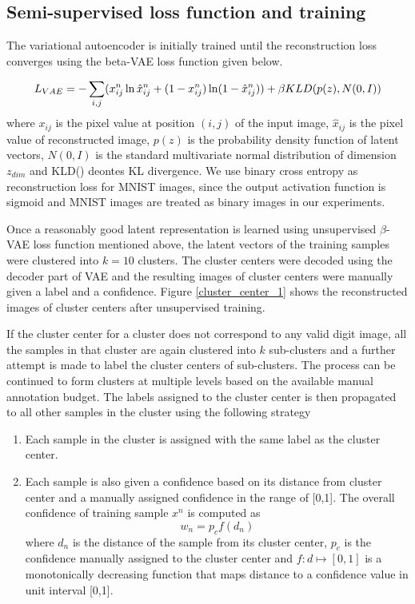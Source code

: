 \documentclass[runningheads]{llncs}
\begin{document}
\subsection{Semi-supervised loss function and training}\label{section_loss_function}
The variational autoencoder is initially trained until the reconstruction loss converges using the beta-VAE loss function\cite{beta_vae} given below.

\begin{equation} \label{vae_loss_eqn}
L_{VAE} = -\sum_{i, j}(x_{ij}^n \ln \hat{x}_{ij}^n
+ (1 - x_{ij}^n) \ln(1 -  \hat{x}_{ij}^n ) )\\
    +\beta KLD(p(z), N(0,I))
\end{equation}
where   $x_{ij}$ is the pixel value at position $(i, j)$ of the input image, $\hat{x}_{ij}$ is the pixel value of reconstructed image, $p(z)$ is the probability density function of latent vectors, $N(0,I)$ is the standard multivariate normal distribution of dimension $z_{dim}$ and KLD() deontes KL divergence.
We use binary cross entropy as reconstruction loss for MNIST images, since the output activation function is sigmoid and MNIST images are treated as binary images in our experiments.

Once a reasonably good latent representation is learned using unsupervised $\beta$-VAE loss function mentioned above, the latent vectors of the training samples were clustered into $k=10$ clusters.
The cluster centers were decoded using the decoder part of VAE and the resulting images of cluster centers were manually given a label and a confidence.
Figure \ref{cluster_center_1} shows the reconstructed images of cluster centers after unsupervised training.


If the cluster center for a cluster does not correspond to any valid digit image, all the samples in that cluster are again clustered into $k$ sub-clusters and a further attempt is made to label the cluster centers of sub-clusters.
The process can be continued to form clusters at multiple levels based on the available manual annotation budget.
The labels assigned to the cluster center is then propagated to all other samples in the cluster using the following strategy
\begin{enumerate}
    \item Each sample in the cluster is assigned with the  same label as the cluster center.
    \item Each sample is also given a confidence based on its distance from cluster center and  a manually assigned confidence in the range of [0,1]. The overall confidence of  training sample $x^n$ is computed as
\begin{equation}
w_n = p_cf(d_n)
\end{equation}
where $d_n$ is the distance of the sample from its cluster center, $p_c$  is the confidence manually assigned to the cluster center and $f: d \mapsto [0,1]$ is a monotonically decreasing function that maps distance to a confidence value in unit interval [0,1].
\end{enumerate}
\end{document}
